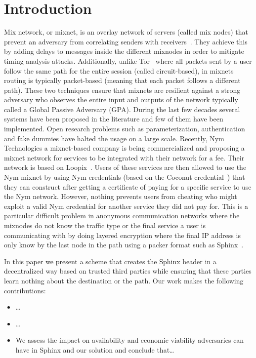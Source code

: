 \section{Introduction}

Mix network, or mixnet, is an overlay network of servers (called mix nodes) that prevent an adversary from correlating senders with receivers~\cite{chaum-mix,cypherpunk-remailer,piotrowska2017loopix,nym-network-whitepaper,danezis2003mixminion, van2015vuvuzela,mixmaster-spec,chaum2016cmix}. They achieve this by adding delays to messages inside the different mixnodes in order to mitigate timing analysis attacks. Additionally, unlike Tor~\cite{onion-routing96} where all packets sent by a user follow the same path for the entire session (called circuit-based), in mixnets routing is typically packet-based (meaning that each packet follows a different path). These two techniques ensure that mixnets are resilient against a strong adversary who observes the entire input and outputs of the network typically called a Global Passive Adversary (GPA).
During the last few decades several systems have been proposed in the literature and few of them have been implemented. Open research problems such as parameterization, authentication and fake dummies have halted the usage on a large scale. Recently, Nym Technologies a mixnet-based company is being commercialized and proposing a mixnet network for services to be integrated with their network for a fee. Their network is based on Loopix~\cite{piotrowska2017loopix}. Users of these services are then allowed to use the Nym mixnet by using Nym credentials (based on the Coconut credential~\cite{coconut}) that they can construct after getting a certificate of paying for a specific service to use the Nym network. However, nothing prevents users from cheating who might exploit a valid Nym credential for another service they did not pay for. This is a particular difficult problem in anonymous communication networks where the mixnodes do not know the traffic type or the final service a user is communicating with by doing layered encryption where the final IP address is only know by the last node in the path using a packer format such as Sphinx~\cite{sphinx}. 

In this paper we present a scheme that creates the Sphinx header in a
decentralized way based on trusted third parties while ensuring that these
parties learn nothing about the destination or the path. Our work makes the
following contributions:
%
\begin{itemize}
%
  \item{\ldots}
%
  \item{\ldots}
%
  \item{We assess the impact on availability and economic viability
adversaries can have in Sphinx and our solution and conclude that\ldots}
%
\end{itemize}
%


